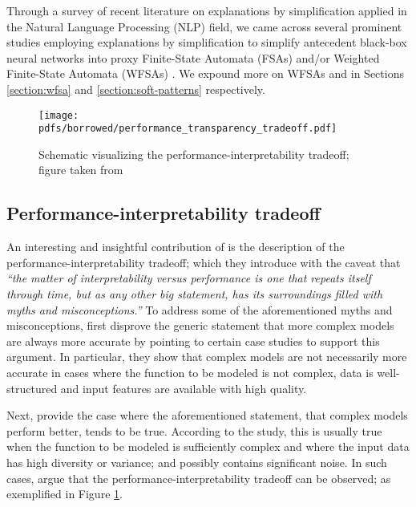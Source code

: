 Through a survey of recent literature on explanations by simplification applied in the Natural Language Processing (NLP) field, we came across several prominent studies employing explanations by simplification to simplify antecedent black-box neural networks into proxy Finite-State Automata (FSAs) and/or Weighted Finite-State Automata (WFSAs) \citep{schwartz2018sopa,peng2018rational,suresh-etal-2019-distilling,wang2019state,jiang2020cold}. We expound more on WFSAs and \citet{schwartz2018sopa} in Sections \ref{section:wfsa} and \ref{section:soft-patterns} respectively.

\begin{figure}[t]
  \centering
  \texttt{[image: pdfs/borrowed/performance\_transparency\_tradeoff.pdf]}
  \caption{Schematic visualizing the performance-interpretability tradeoff; figure taken from \citet{arrieta2020explainable}}
  \label{fig:performance_interpretability_tradeoff}
\end{figure}

\subsection{Performance-interpretability tradeoff}

An interesting and insightful contribution of \citet[Page 18, Section 5.1]{arrieta2020explainable} is the description of the performance-interpretability tradeoff; which they introduce with the caveat that \textit{``the matter of interpretability versus performance is one that repeats itself through time, but as any other big statement, has its surroundings filled with myths and misconceptions.''} To address some of the aforementioned myths and misconceptions, \citet{arrieta2020explainable} first disprove the generic statement that more complex models are always more accurate by pointing to certain case studies to support this argument. In particular, they show that complex models are not necessarily more accurate in cases where the function to be modeled is not complex, data is well-structured and input features are available with high quality.

Next, \citet{arrieta2020explainable} provide the case where the aforementioned statement, that complex models perform better, tends to be true. According to the study, this is usually true when the function to be modeled is sufficiently complex and where the input data has high diversity or variance; and possibly contains significant noise. In such cases, \citet{arrieta2020explainable} argue that the performance-interpretability tradeoff can be observed; as exemplified in Figure \ref{fig:performance_interpretability_tradeoff}.
 

